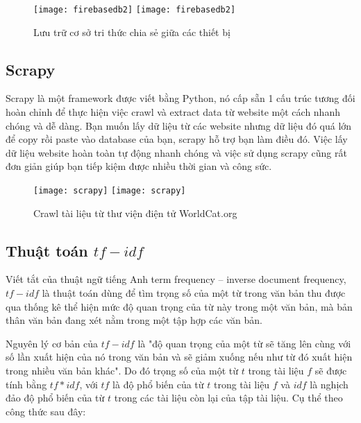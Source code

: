  \begin{figure}[!htbp]
  \begin{center}
    \ifpdf
      \texttt{[image: firebasedb2]}
    \else
      \texttt{[image: firebasedb2]}
    \fi
    \caption{Lưu trữ cơ sở tri thức chia sẻ giữa các thiết bị}
    \label{FirebaseDB2}
  \end{center}
\end{figure}

\subsection{Scrapy}

Scrapy là một framework được viết bằng Python, nó cấp sẵn 1 cấu trúc tương đối hoàn chỉnh để thực hiện việc crawl và extract data từ website một cách nhanh chóng và dễ dàng. Bạn muốn lấy dữ liệu từ các website nhưng dữ liệu đó quá lớn để copy rồi paste vào database của bạn, scrapy hỗ trợ bạn làm điều đó. Việc lấy dữ liệu website hoàn toàn tự động nhanh chóng và việc sử dụng scrapy cũng rất đơn giản giúp bạn tiếp kiệm được nhiều thời gian và công sức.

 \begin{figure}[!htbp]
  \begin{center}
    \ifpdf
      \texttt{[image: scrapy]}
    \else
      \texttt{[image: scrapy]}
    \fi
    \caption{Crawl tài liệu từ thư viện điện tử WorldCat.org }
    \label{Scrapy}
  \end{center}
\end{figure}

\subsection{Thuật toán $tf-idf$}

Viết tắt của thuật ngữ tiếng Anh term frequency – inverse document frequency,$tf-idf$ là thuật toán dùng để tìm trọng số của một từ trong văn bản thu được qua thống kê thể hiện mức độ quan trọng của từ này trong một văn bản, mà bản thân văn bản đang xét nằm trong một tập hợp các văn bản.\cite{tf-idf}

Nguyên lý cơ bản của $tf-idf$ là "độ quan trọng của một từ sẽ tăng lên cùng với số lần xuất hiện của nó trong văn bản và sẽ giảm xuống nếu như từ đó xuất hiện trong nhiều văn bản khác". Do đó trọng số của một từ $t$ trong tài liệu $f$ sẽ được tính bằng $tf * idf$, với $tf$ là độ phổ biến của từ $t$ trong tài liệu $f$ và $idf$ là nghịch đảo độ phổ biến của từ $t$ trong các tài liệu còn lại của tập tài liệu. Cụ thể theo công thức sau đây:

